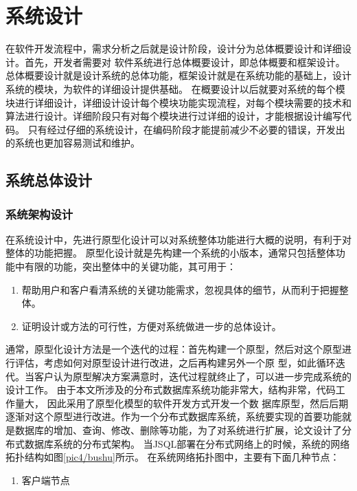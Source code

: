 
\chapter{系统设计}
在软件开发流程中，需求分析之后就是设计阶段，设计分为总体概要设计和详细设计。首先，开发者需要对
软件系统进行总体概要设计，即总体概要和框架设计。总体概要设计就是设计系统的总体功能，框架设计就是在系统功能的基础上，设计系统的模块，为软件的详细设计提供基础。
在概要设计以后就要对系统的每个模块进行详细设计，详细设计设计每个模块功能实现流程，对每个模块需要的技术和算法进行设计。详细阶段只有对每个模块进行过详细的设计，才能根据设计编写代码。
只有经过仔细的系统设计，在编码阶段才能提前减少不必要的错误，开发出的系统也更加容易测试和维护。
\section{系统总体设计}
\subsection{系统架构设计}
在系统设计中，先进行原型化设计可以对系统整体功能进行大概的说明，有利于对整体的功能把握。
原型化设计就是先构建一个系统的小版本，通常只包括整体功能中有限的功能，突出整体中的关键功能，其可用于：
\begin{enumerate}
	\item 帮助用户和客户看清系统的关键功能需求，忽视具体的细节，从而利于把握整体。
	\item 证明设计或方法的可行性，方便对系统做进一步的总体设计。
\end{enumerate}
通常，原型化设计方法是一个迭代的过程：首先构建一个原型，然后对这个原型进行评估，考虑如何对原型设计进行改进，之后再构建另外一个原
型，如此循环迭代。当客户认为原型解决方案满意时，迭代过程就终止了，可以进一步完成系统的设计工作。
由于本文所涉及的分布式数据库系统功能非常大，结构非常，代码工作量大，
因此采用了原型化模型的软件开发方式开发一个数
据库原型，然后后期逐渐对这个原型进行改进。作为一个分布式数据库系统，系统要实现的首要功能就是数据库的增加、查询、修改、删除等功能，为了对系统进行扩展，论文设计了分布式数据库系统的分布式架构。
当JSQL部署在分布式网络上的时候，系统的网络拓扑结构如图\ref{pic4/bushu}所示。
在系统网络拓扑图中，主要有下面几种节点：


	\begin{enumerate}
		\item 客户端节点
	\end{enumerate}

